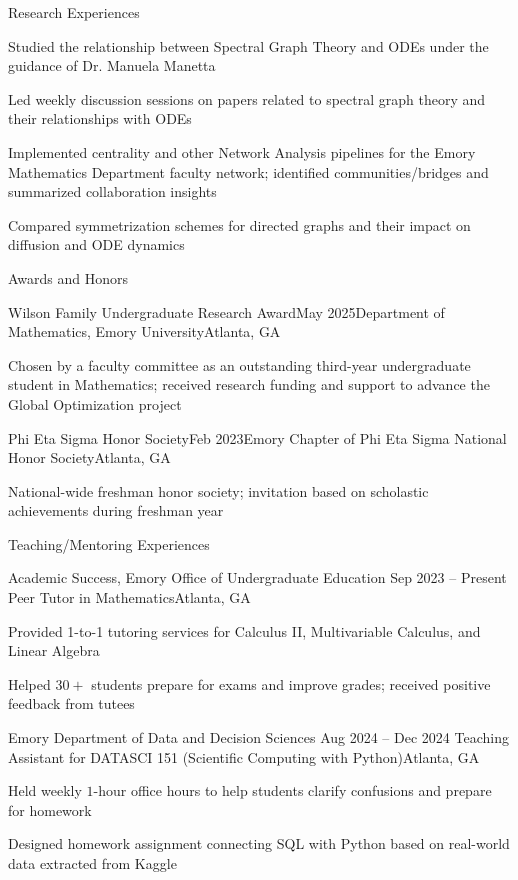 \documentclass[10pt, letterpaper]{resume} %
\begin{document}
\begin{rSection}{Research Experiences}
\begin{rSubsection}
	\item Studied the relationship between Spectral Graph Theory and  ODEs under the guidance of Dr. Manuela Manetta
	\item Led weekly discussion sessions on papers related to spectral graph theory and their relationships with ODEs 
	\item Implemented centrality and other Network Analysis pipelines for the Emory Mathematics Department faculty network; identified communities/bridges and summarized collaboration insights
	\item Compared symmetrization schemes for directed graphs and their impact on diffusion and ODE dynamics
\end{rSubsection}
\end{rSection} 

\newpage
\begin{rSection}{Awards and Honors}
\begin{rSubsection}{Wilson Family Undergraduate Research Award}{May 2025}{Department of Mathematics, Emory University}{Atlanta, GA}
	\item Chosen by a faculty committee as an outstanding third-year undergraduate student in Mathematics; received research funding and support to advance the Global Optimization project
\end{rSubsection}

\begin{rSubsection}{Phi Eta Sigma Honor Society}{Feb 2023}{Emory Chapter of Phi Eta Sigma National Honor Society}{Atlanta, GA}
	\item National-wide freshman honor society; invitation based on scholastic achievements during freshman year
\end{rSubsection}
\end{rSection} 

\begin{rSection}{Teaching/Mentoring Experiences}
\begin{rSubsection}
	{Academic Success, Emory Office of Undergraduate Education}
	{Sep 2023 -- Present}
	{Peer Tutor in Mathematics}{Atlanta, GA}
	
	\item Provided 1-to-1 tutoring services for Calculus II, Multivariable Calculus, and Linear Algebra 
	\item Helped $30+$ students prepare for exams and improve grades; received positive feedback from tutees
\end{rSubsection}

\begin{rSubsection}
	{Emory Department of Data and Decision Sciences}
	{Aug 2024 -- Dec 2024}
	{Teaching Assistant for DATASCI 151 (Scientific Computing with Python)}{Atlanta, GA}
	
	\item Held weekly $1$-hour office hours to help students clarify confusions and prepare for homework 
	\item Designed homework assignment connecting SQL with Python based on real-world data extracted from Kaggle 
\end{rSubsection}
\end{rSection}
\end{document}
